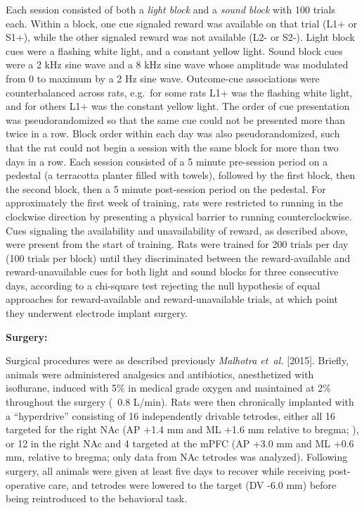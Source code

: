 \documentclass[11pt]{article}
\let\citeNP=\citealt
\newcommand{\ldiffentity}[1]{#1}
\begin{document}
Each session consisted of both a {\it light block} and a {\it sound block} with
100 trials each. Within a block, one cue signaled reward was available on that
trial (L1+ or S1+), while the other signaled reward was not available (L2- or
S2-). Light block cues were a flashing white light, and a constant yellow
light. Sound block cues were a 2 kHz sine wave and a 8 kHz sine wave whose
amplitude was modulated from 0 to maximum by a 2 Hz sine wave. Outcome-cue
associations were counterbalanced across rats, e.g.\ for some rats L1+ was the
flashing white light, and for others L1+ was the constant yellow light. The
order of cue presentation was pseudorandomized so that the same cue could not be
presented more than twice in a row. Block order within each day was also
pseudorandomized, such that the rat could not begin a session with the same
block for more than two days in a row. Each session consisted of a 5 minute
pre-session period on a pedestal (a terracotta planter filled with towels),
followed by the first block, then the second block, then a 5 minute post-session
period on the pedestal. For approximately the first week of training, rats were restricted to
running in the clockwise direction by presenting a physical barrier to
running counterclockwise. Cues signaling the availability and
unavailability of reward, as described above, were present from the
start of training. Rats were trained for 200 trials per day (100
trials per block) until they discriminated between the reward-available and reward-unavailable cues for both light and
sound blocks for three consecutive days, according to a chi-square test
rejecting the null hypothesis of equal approaches for reward-available and
reward-unavailable trials, at which point they underwent electrode implant
surgery.

{\bf Surgery:}

Surgical procedures were as described previously
\ldiffentity{\textit{Malhotra et~al.} [\ldiffentity{2015}]}. Briefly, animals were administered analgesics and
antibiotics, anesthetized with isoflurane, induced with 5\% in medical
grade oxygen and maintained at 2\% throughout the surgery (~0.8
L/min). Rats were then chronically implanted with a ``hyperdrive''
consisting of 16 independently drivable tetrodes, either all 16
targeted for the right NAc (AP +1.4 mm and ML +1.6 mm relative to
bregma; \citeNP{atlas}), or 12 in the right NAc and 4 targeted at the
mPFC (AP +3.0 mm and ML +0.6 mm, relative to bregma; only data from
NAc tetrodes was analyzed). Following surgery, all animals were given
at least five days to recover while receiving post-operative care, and
tetrodes were lowered to the target (DV -6.0 mm) before being
reintroduced to the behavioral task.
\end{document}
